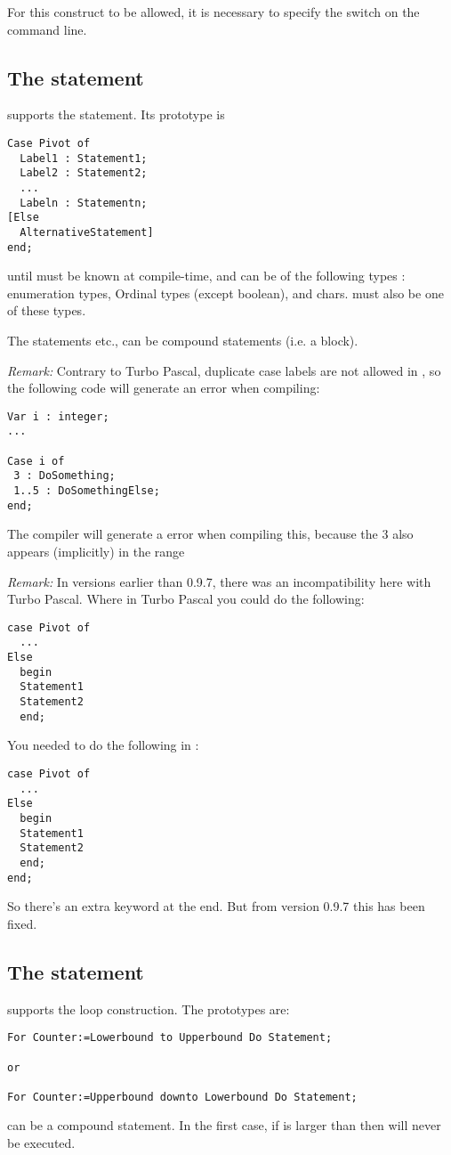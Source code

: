 \documentclass{report}
\begin{document}
For this construct to be allowed, it is necessary to specify the 
switch on the command line.

\subsection{The  statement}
\fpk supports the  statement. Its prototype is
\begin{verbatim}
Case Pivot of
  Label1 : Statement1;
  Label2 : Statement2;
  ...
  Labeln : Statementn;
[Else
  AlternativeStatement]
end;
\end{verbatim}
 until  must be known at compile-time, and can be of
the following types : enumeration types, Ordinal types (except boolean), and
chars.  must also be one of these types.

The statements  etc., can be compound statements (i.e. a
 block).

{\em Remark:} Contrary to Turbo Pascal, duplicate case labels are not
allowed in \fpk, so the following code will generate an error when
compiling:

\begin{verbatim}
Var i : integer;
...

Case i of
 3 : DoSomething;
 1..5 : DoSomethingElse;
end;
\end{verbatim}
The compiler will generate a  error when compiling
this, because the 3 also appears (implicitly) in the range 

{\em Remark:} In versions earlier than 0.9.7, there was an incompatibility here 
with Turbo Pascal. Where in Turbo Pascal you could do the following:
\begin{verbatim}
case Pivot of
  ...
Else
  begin
  Statement1
  Statement2
  end;
\end{verbatim}
You needed to do the following in \fpk :
\begin{verbatim}
case Pivot of
  ...
Else
  begin
  Statement1
  Statement2
  end;
end;
\end{verbatim}
So there's an extra  keyword at the end. But from version 0.9.7
this has been fixed.
\subsection{The  statement}
\fpk supports the  loop construction. The prototypes are:
\begin{verbatim}
For Counter:=Lowerbound to Upperbound Do Statement;

or 

For Counter:=Upperbound downto Lowerbound Do Statement;
\end{verbatim}
 can be a compound statement. In the first case, if
 is larger than  then  will
never be executed.
\end{document}
